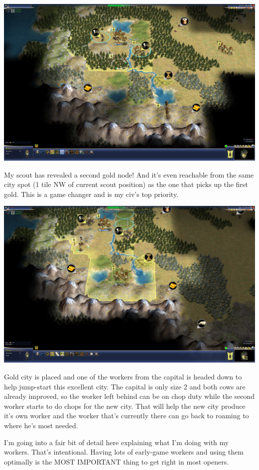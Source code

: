 \documentclass[10pt]{article}
\begin{document}
\includegraphics[width=1.0\textwidth]{12}

My scout has revealed a second gold node! And it's even reachable from the same city spot (1 tile NW of
current scout position) as the one that picks up the first gold. This is a game changer and is my civ's
top priority.

\includegraphics[width=1.0\textwidth]{13}

Gold city is placed and one of the workers from the capital is headed down to help jump-start this
excellent city. The capital is only size 2 and both cows are already improved, so the worker left behind
can be on chop duty while the second worker starts to do chops for the new city. That will help the new city
produce it's own worker and the worker that's currently there can go back to roaming to where he's most
needed.

I'm going into a fair bit of detail here explaining what I'm doing with my workers. That's intentional. Having
lots of early-game workers and using them optimally is the MOST IMPORTANT thing to get right in most openers.
\end{document}
